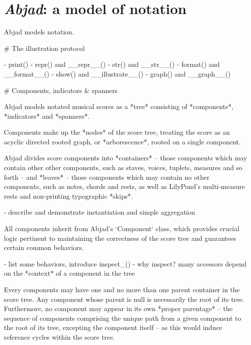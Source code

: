 \chapter{\emph{Abjad}: a model of notation}
\label{chap:a-model-of-notation}

\begin{markdown}

Abjad models notation.

# The illustration protocol

-   print()
-   repr() and __repr__()
-   str() and __str__()
-   format() and __format__()
-   show() and __illustrate__()
-   graph() and __graph__()

# Components, indicators & spanners

Abjad models notated musical scores as a *tree* consisting of *components*,
*indicators* and *spanners*.

Components make up the *nodes* of the score tree, treating the score as an
acyclic directed rooted graph, or *arborescence*, rooted on a single component.

Abjad divides score components into *containers* -- those components which may
contain other other components, such as staves, voices, tuplets, measures and
so forth -- and *leaves* -- those components which may contain no other
components, such as notes, chords and rests, as well as LilyPond's
multi-measure rests and non-printing typographic *skips*.

-   describe and demonstrate instantiation and simple aggregation

All components inherit from Abjad's `Component` class, which provides crucial
logic pertinent to maintaining the correctness of the score tree and guarantees
certain common behaviors.

-   list some behaviors, introduce inspect_()
-   why inspect? many accessors depend on the *context* of a component in the
    tree

Every components may have one and no more than one parent container in the
score tree. Any component whose parent is null is necessarily the root of its
tree. Furthermore, no component may appear in its own *proper parentage* -- the
sequence of components comprising the unique path from a given component to the
root of its tree, excepting the component itself -- as this would induce
reference cycles within the score tree.


\end{markdown}
